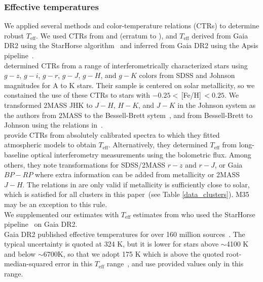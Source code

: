 \documentclass{aa}
\begin{document}
\subsubsection{Effective temperatures}
We applied several methods and color-temperature relations (CTRs) to determine robust $T_\mathrm{eff}$. We used CTRs from \citet{boyajian_stellar_2013} and \citet{mann_erratum_2016} (erratum to \citealt{mann_how_2015}), and $T_\mathrm{eff}$ derived from Gaia DR2 using the StarHorse algorithm~\citep{queiroz_starhorse_2018} and inferred from Gaia DR2 using the Apsis pipeline~\citep{bailerjones_apsis_2013, andrae_gaiaapsis_2018}.
\\
\citet{boyajian_stellar_2013} determined CTRs from a range of interferometrically characterized stars using $g-z$, $g-i$, $g-r$, $g-J$, $g-H$, and $g-K$ colors from SDSS and Johnson magnitudes for A to K stars. Their sample is centered on solar metallicity, so we constained the use of these CTRs to stars with $-0.25<$\,[Fe/H]$\,<0.25$. We transformed 2MASS JHK to $J-H$, $H-K$, and $J-K$ in the Johnson system  as the authors from 2MASS to the Bessell-Brett sytem~\citep{carpenter_color_2001}, and from Bessell-Brett to Johnson using the relations in~\citet{bessell_brett_1988}. 
\\
\citet{mann_how_2015} provide CTRs from absolutely calibrated spectra to which they fitted atmospheric models to obtain $T_\mathrm{eff}$. Alternatively, they determined $T_\mathrm{eff}$ from long-baseline optical interferometry measurements using the bolometric flux. Among others, they note transformations for SDSS/2MASS $r-z$ and $r-J$, or Gaia $BP-RP$ where extra information can be added from metallicity or 2MASS $J-H$. The relations in \citet{mann_how_2015} are only valid if metallicity is sufficiently close to solar, which is satisfied for all clusters in this paper~(see Table \ref{data_clusters}). M35 may be an exception to this rule.
\\
We supplemented our estimates with $T_\mathrm{eff}$ estimates from \citet{anders_starhorse_2019} who used the StarHorse pipeline~\citep{queiroz_starhorse_2018} on Gaia DR2.
\\
Gaia DR2 published effective temperatures for over 160 million sources~\citep{gaia_dr2_release_2018}. The typical uncertainty is quoted at 324 K, but it is lower for stars above $\sim$4100 K and below $\sim$6700K, so that we adopt 175 K which is above the quoted root-median-squared error in this $T_\mathrm{eff}$ range~\citep{andrae_gaiaapsis_2018}, and use provided values only in this range.
\end{document}
